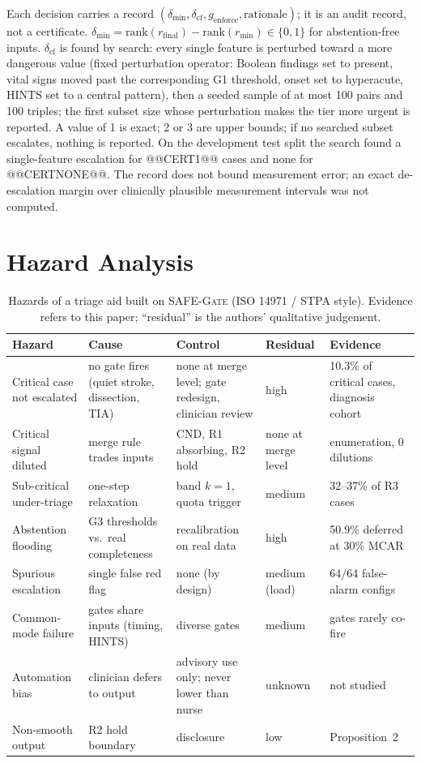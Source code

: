 \documentclass[11pt,a4paper]{article}%
\newcommand{\safegate}{\textsc{SAFE-Gate}}
\begin{document}
Each decision carries a record $(\delta_{\min},\delta_{\text{cf}},g_{\text{enforce}},\text{rationale})$; it is an audit record, not a certificate. $\delta_{\min}=\text{rank}(r_{\text{final}})-\text{rank}(r_{\min})\in\{0,1\}$ for abstention-free inputs. $\delta_{\text{cf}}$ is found by search: every single feature is perturbed toward a more dangerous value (fixed perturbation operator: Boolean findings set to present, vital signs moved past the corresponding G1 threshold, onset set to hyperacute, HINTS set to a central pattern), then a seeded sample of at most 100 pairs and 100 triples; the first subset size whose perturbation makes the tier more urgent is reported. A value of 1 is exact; 2 or 3 are upper bounds; if no searched subset escalates, nothing is reported. On the development test split the search found a single-feature escalation for @@CERT1@@ cases and none for @@CERTNONE@@. The record does not bound measurement error; an exact de-escalation margin over clinically plausible measurement intervals was not computed.

\section{Hazard Analysis}\label{sup:hazard}

\begin{table}[h]
\caption{Hazards of a triage aid built on \safegate{} (ISO 14971 / STPA style). Evidence refers to this paper; ``residual'' is the authors' qualitative judgement.}\label{tab:hazard}
\footnotesize
\begin{tabular}{@{}p{}p{}p{}p{}p{}@{}}
\toprule
Hazard & Cause & Control & Residual & Evidence \\
\midrule
Critical case not escalated & no gate fires (quiet stroke, dissection, TIA) & none at merge level; gate redesign, clinician review & high & 10.3\% of critical cases, diagnosis cohort \\
Critical signal diluted & merge rule trades inputs & CND, R1 absorbing, R2 hold & none at merge level & enumeration, 0 dilutions \\
Sub-critical under-triage & one-step relaxation & band $k=1$, quota trigger & medium & 32--37\% of R3 cases \\
Abstention flooding & G3 thresholds vs.\ real completeness & recalibration on real data & high & 50.9\% deferred at 30\% MCAR \\
Spurious escalation & single false red flag & none (by design) & medium (load) & 64/64 false-alarm configs \\
Common-mode failure & gates share inputs (timing, HINTS) & diverse gates & medium & gates rarely co-fire \\
Automation bias & clinician defers to output & advisory use only; never lower than nurse & unknown & not studied \\
Non-smooth output & R2 hold boundary & disclosure & low & Proposition~2 \\
\bottomrule
\end{tabular}
\end{table}
\end{document}
